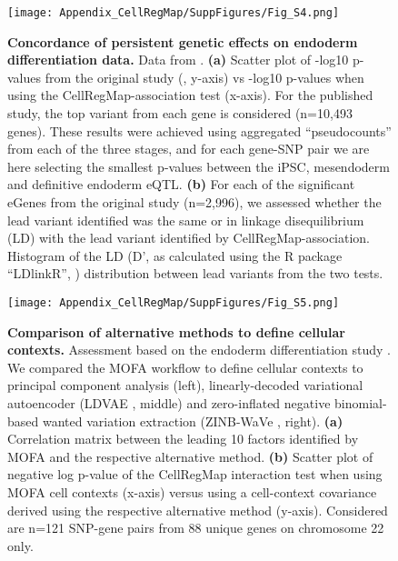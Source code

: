 \begin{figure}[h]
    \centering
    \texttt{[image: Appendix\_CellRegMap/SuppFigures/Fig\_S4.png]}
    \caption{\textbf{Concordance of persistent genetic effects on endoderm differentiation data.}
    Data from \cite{cuomo2020single}. 
    \textbf{(a)} Scatter plot of -log10 p-values from the original study (\cite{cuomo2020single}, y-axis) vs -log10 p-values when using the CellRegMap-association test (x-axis). 
    For the published study, the top variant from each gene is considered (n=10,493 genes). 
    These results were achieved using aggregated “pseudocounts” from each of the three stages, and for each gene-SNP pair we are here selecting the smallest p-values between the iPSC, mesendoderm and definitive endoderm eQTL. 
    \textbf{(b)} For each of the significant eGenes from the original study (n=2,996), we assessed whether the lead variant identified was the same or in linkage disequilibrium (LD) with the lead variant identified by CellRegMap-association. 
    Histogram of the LD (D’, as calculated using the R package “LDlinkR”, \cite{myers2020ldlinkr}) distribution between lead variants from the two tests.
}
\end{figure}

\begin{figure}[h]
    \centering
    \texttt{[image: Appendix\_CellRegMap/SuppFigures/Fig\_S5.png]}
    \caption{\textbf{Comparison of alternative methods to define cellular contexts.}
    Assessment based on the endoderm differentiation study \cite{cuomo2020single}. 
    We compared the MOFA workflow to define cellular contexts to principal component analysis (left), linearly-decoded variational autoencoder (LDVAE \cite{svensson2020interpretable}, middle) and zero-inflated negative binomial-based wanted variation extraction (ZINB-WaVe \cite{risso2018general}, right). 
    \textbf{(a)} Correlation matrix between the leading 10 factors identified by MOFA and the respective alternative method.  
    \textbf{(b)} Scatter plot of negative log p-value of the CellRegMap interaction test when using MOFA cell contexts (x-axis) versus using a cell-context covariance derived using the respective alternative method (y-axis). 
    Considered are n=121 SNP-gene pairs from 88 unique genes on chromosome 22 only.
}
\end{figure}

